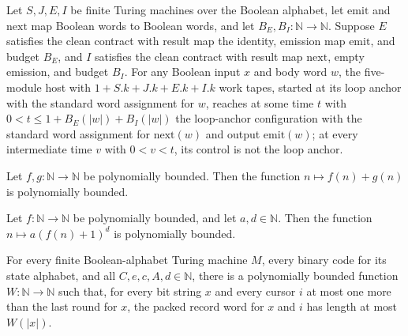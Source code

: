 \begin{lemma}
\label{Complexity.clA5Round}
\leanok
{}
Let $S,J,E,I$ be finite Turing machines over the Boolean alphabet, let $\mathrm{emit}$
and $\mathrm{next}$ map Boolean words to Boolean words, and let
$B_E,B_I:\mathbb{N}\to\mathbb{N}$. Suppose $E$ satisfies the clean contract with result
map the identity, emission map $\mathrm{emit}$, and budget $B_E$, and $I$ satisfies the
clean contract with result map $\mathrm{next}$, empty emission, and budget $B_I$. For
any Boolean input $x$ and body word $w$, the five-module host with $1+S.k+J.k+E.k+I.k$
work tapes, started at its loop anchor with the standard word assignment for $w$,
reaches at some time $t$ with $0<t\le 1+B_E(|w|)+B_I(|w|)$ the loop-anchor configuration
with the standard word assignment for $\mathrm{next}(w)$ and output $\mathrm{emit}(w)$;
at every intermediate time $v$ with $0<v<t$, its control is not the loop anchor.
\end{lemma}

\begin{lemma}
\label{Complexity.clA5Poly_add}
\leanok
{}
Let $f,g : \mathbb{N} \to \mathbb{N}$ be polynomially bounded. Then the function $n
\mapsto f(n)+g(n)$ is polynomially bounded.
\end{lemma}

\begin{lemma}
\label{Complexity.clA5Poly_call}
\leanok
{}
Let $f : \mathbb{N} \to \mathbb{N}$ be polynomially bounded, and let $a,d \in
\mathbb{N}$. Then the function $n \mapsto a(f(n)+1)^d$ is polynomially bounded.
\end{lemma}

\begin{lemma}
\label{Complexity.clA5Pack_bound}
\leanok
{}
For every finite Boolean-alphabet Turing machine $M$, every binary code for its state
alphabet, and all $C,e,c,A,d\in\mathbb{N}$, there is a polynomially bounded function
$W:\mathbb{N}\to\mathbb{N}$ such that, for every bit string $x$ and every cursor $i$ at
most one more than the last round for $x$, the packed record word for $x$ and $i$ has
length at most $W(|x|)$.
\end{lemma}

